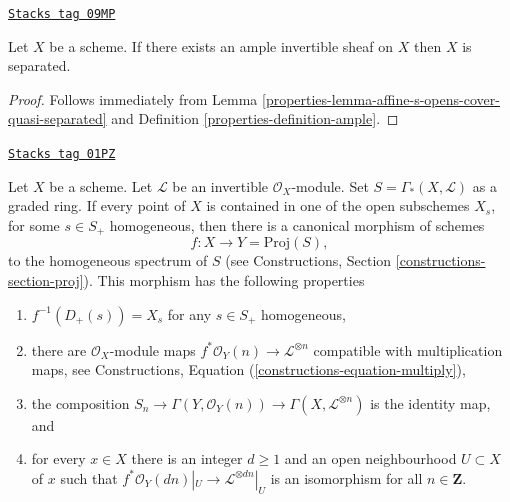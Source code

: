 \begin{lemma}
\label{properties-lemma-ample-separated}
\href{https://stacks.math.columbia.edu/tag/09MP}{\texttt{Stacks tag 09MP}}

Let $X$ be a scheme. If there exists an ample invertible sheaf on $X$
then $X$ is separated.
\end{lemma}

\begin{proof}

Follows immediately from
Lemma \ref{properties-lemma-affine-s-opens-cover-quasi-separated} and
Definition \ref{properties-definition-ample}.
\end{proof}

\begin{lemma}
\label{properties-lemma-map-into-proj}
\href{https://stacks.math.columbia.edu/tag/01PZ}{\texttt{Stacks tag 01PZ}}

Let $X$ be a scheme.
Let $\mathcal{L}$ be an invertible $\mathcal{O}_X$-module.
Set $S = \Gamma_*(X, \mathcal{L})$ as a graded ring.
If every point of $X$ is contained in one of the
open subschemes $X_s$, for some $s \in S_{+}$ homogeneous, then
there is a canonical morphism of schemes
$$
f : X \longrightarrow Y = \text{Proj}(S),
$$
to the homogeneous spectrum of $S$ (see
Constructions, Section \ref{constructions-section-proj}).
This morphism has the following properties
\begin{enumerate}
\item $f^{-1}(D_{+}(s)) = X_s$ for any $s \in S_{+}$ homogeneous,
\item there are $\mathcal{O}_X$-module maps
$f^*\mathcal{O}_Y(n) \to \mathcal{L}^{\otimes n}$
compatible with multiplication maps, see
Constructions, Equation (\ref{constructions-equation-multiply}),
\item the composition
$S_n \to \Gamma(Y, \mathcal{O}_Y(n)) \to \Gamma(X, \mathcal{L}^{\otimes n})$
is the identity map, and
\item for every $x \in X$ there is an integer $d \geq 1$
and an open neighbourhood $U \subset X$ of $x$
such that $f^*\mathcal{O}_Y(dn)|_U \to \mathcal{L}^{\otimes dn}|_U$
is an isomorphism for all $n \in \mathbf{Z}$.
\end{enumerate}
\end{lemma}

